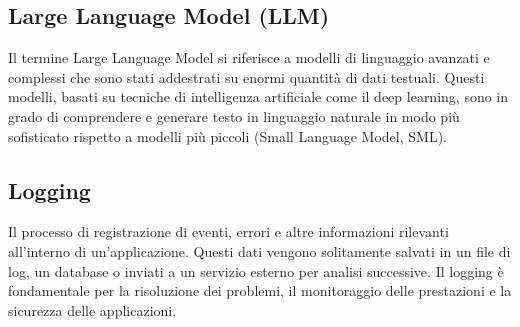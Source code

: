 \hypertarget{sec:LLM}{}
\subsection*{Large Language Model (LLM)}
Il termine Large Language Model si riferisce a modelli di linguaggio avanzati e complessi che sono stati addestrati su enormi quantità di dati testuali. 
Questi modelli, basati su tecniche di intelligenza artificiale come il deep learning, sono in grado di comprendere e generare testo in linguaggio naturale 
in modo più sofisticato rispetto a modelli più piccoli (Small Language Model, SML).

\hypertarget{sec:logging}{}
\subsection*{Logging}
Il processo di registrazione di eventi, errori e altre informazioni rilevanti all'interno di un'applicazione. Questi dati vengono 
solitamente salvati in un file di log, un database o inviati a un servizio esterno per analisi successive. Il logging è fondamentale 
per la risoluzione dei problemi, il monitoraggio delle prestazioni e la sicurezza delle applicazioni.

\newpage